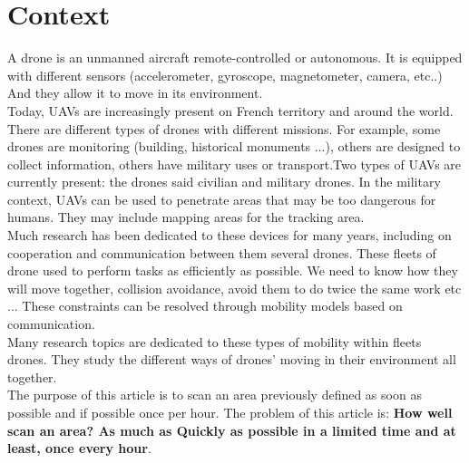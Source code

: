 \chapter{Context}

A drone is an unmanned aircraft remote-controlled or autonomous. It is equipped with different sensors (accelerometer, gyroscope, magnetometer, camera, etc..) And they allow it to move in its environment.\\

Today, UAVs are increasingly present on French territory and around the world. There are different types of drones with different missions. For example, some drones are monitoring (building, historical monuments ...), others are designed to collect information, others have military uses or transport.Two types of UAVs are currently present: the drones said civilian and military drones. In the military context, UAVs can be used to penetrate areas that may be too dangerous for humans. They may include mapping areas for the tracking area.\\

Much research has been dedicated to these devices for many years, including on cooperation and communication between them several drones. These fleets of drone used to perform tasks as efficiently as possible. We need to know how they will move together, collision avoidance, avoid them to do twice the same work etc ... These constraints can be resolved through mobility models based on communication.\\
Many research topics are dedicated to these types of mobility within fleets drones. They study the different ways of drones' moving in their environment all together.\\

The purpose of this article is to scan an area previously defined as soon as possible and if possible once per hour. The problem of this article is:
\textbf{How well scan an area? As much as Quickly as possible in a limited time and at least, once every hour}.